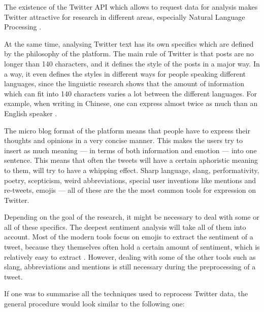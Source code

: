 The existence of the Twitter API which allows to request data for analysis makes Twitter attractive for research in different areas, especially Natural Language Processing \cite{twitterapi}. 

At the same time, analysing Twitter text has its own specifics which are defined by the philosophy of the platform. The main rule of Twitter is that posts are no longer than 140 characters, and it defines the style of the posts in a major way. In a way, it even defines the styles in different ways for people speaking different languages, since the linguistic research shows that the amount of information which can fit into 140 characters varies a lot between the different languages. For example, when writing in Chinese, one can express almost twice as much than an English speaker \cite{neubig2013much}. 

The micro blog format of the platform means that people have to express their thoughts and opinions in a very concise manner. This makes the users try to insert as much meaning --- in terms of both information and emotion --- into one sentence. This means that often the tweets will have a certain aphoristic meaning to them, will try to have a whipping effect. Sharp language, slang, performativity, poetry, scepticism, weird abbreviations, special user inventions like mentions and re-tweets, emojis --- all of these are the the most common tools for expression on Twitter. 

Depending on the goal of the research, it might be necessary to deal with some or all of these specifics. The deepest sentiment analysis will take all of them into account. Most of the modern tools focus on emojis to extract the sentiment of a tweet, because they themselves often hold a certain amount of sentiment, which is relatively easy to extract \cite{novak2015sentiment}. However, dealing with some of the other tools such as slang, abbreviations and mentions is still necessary during the preprocessing of a tweet.

If one was to summarise all the techniques used to reprocess Twitter data, the general procedure would look similar to the following one:

